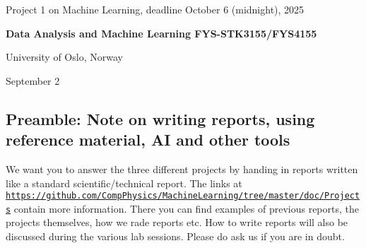 \documentclass[%
oneside,                 %
final,                   %
10pt]{article}
\begin{document}

\newcommand{\exercisesection}[1]{\subsection*{#1}}






\thispagestyle{empty}

\begin{center}
{\LARGE\bf
\begin{spacing}{1.25}
Project 1 on Machine Learning, deadline October 6 (midnight), 2025
\end{spacing}
}
\end{center}


\begin{center}
{\bf Data Analysis and Machine Learning FYS-STK3155/FYS4155}
\end{center}

    \begin{center}
\centerline{{\small University of Oslo, Norway}}
\end{center}
    

\begin{center}
September 2
\end{center}

\vspace{1cm}


\subsection*{Preamble: Note on writing reports, using reference material, AI and other tools}

We want you to answer the three different projects by handing in
reports written like a standard scientific/technical report.  The
links at
\href{{https://github.com/CompPhysics/MachineLearning/tree/master/doc/Projects}}{\nolinkurl{https://github.com/CompPhysics/MachineLearning/tree/master/doc/Projects}}
contain more information. There you can find examples of previous
reports, the projects themselves, how we rade reports etc. How to
write reports will also be discussed during the various lab
sessions. Please do ask us if you are in doubt.
\end{document}
